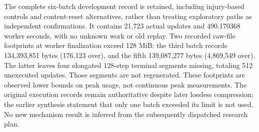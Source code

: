 The complete six-batch development record is retained, including injury-based controls and content-reset alternatives, rather than treating exploratory paths as independent confirmations. It contains 21,723 actual updates and 490.170368 worker seconds, with no unknown work or old replay. Two recorded raw-file footprints at worker finalization exceed 128 MiB: the third batch records 134,393,851 bytes (176,123 over), and the fifth 139,087,277 bytes (4,869,549 over). The latter leaves four elongated 128-step terminal segments missing, totaling 512 unexecuted updates. Those segments are not regenerated. These footprints are observed lower bounds on peak usage, not continuous peak measurements. The original execution records remain authoritative despite later lossless compression; the earlier synthesis statement that only one batch exceeded its limit is not used. No new mechanism result is inferred from the subsequently dispatched research plan.





